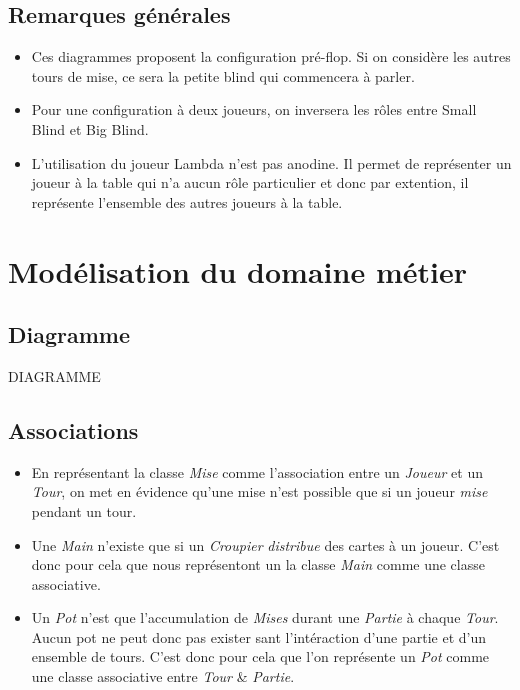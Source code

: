 \subsection{Remarques générales}
\begin{itemize}
	\item Ces diagrammes proposent la configuration pré-flop. Si on considère 
	      les autres tours de mise, ce sera la petite blind qui commencera à 
	      parler.
	\item Pour une configuration à deux joueurs, on inversera les rôles entre 
	      Small Blind et Big Blind.
	\item L'utilisation du joueur Lambda n'est pas anodine. Il permet de 
	      représenter un joueur à la table qui n'a aucun rôle particulier et 
	      donc par extention, il représente l'ensemble des autres joueurs à la 
	      table.
\end{itemize}

\section{Modélisation du domaine métier}
\subsection{Diagramme}
DIAGRAMME
\subsection{Associations}
\begin{itemize}
	\item En représentant la classe \textit{Mise} comme l'association entre un 
	      \textit{Joueur} et un \textit{Tour}, on met en évidence qu'une mise 
	       n'est possible que si un joueur \textit{mise} pendant un tour.
	\item Une \textit{Main} n'existe que si un \textit{Croupier} 
	      \textit{distribue} des cartes à un joueur. C'est donc pour cela que 
	      nous représentont un la classe \textit{Main} comme une classe 
	      associative.
	\item Un \textit{Pot} n'est que l'accumulation de \textit{Mises} durant une 
	      \textit{Partie} à chaque \textit{Tour}. Aucun pot ne peut donc pas 
	      exister sant l'intéraction d'une partie et d'un ensemble de tours. 
	      C'est donc pour cela que l'on représente un \textit{Pot} comme une 
	      classe associative entre \textit{Tour} \& \textit{Partie}.
\end{itemize}
